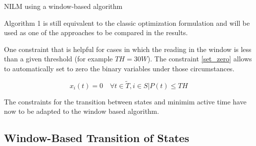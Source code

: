 \begin{algorithm}\label{algorithm1}
\SetAlgoLined
 \caption{NILM using a window-based algorithm}
\end{algorithm}

Algorithm 1 is still equivalent to the classic optimization formulation and will be used as one of the approaches to be compared in the results. 



One constraint that is helpful for cases in which the reading in the window is less than a given threshold (for example $TH = 30W$). The constraint \eqref{set_zero} allows to automatically set to zero the binary variables under those circumstances. 

\begin{equation} \label{set_zero}
   x_i(t) = 0 \quad \forall t \in \tilde{T}, i \in S | P(t) \leq TH
\end{equation}

The constraints for the transition between states and minimim active time have now to be adapted to the window based algorithm.

\subsection{Window-Based Transition of States}

